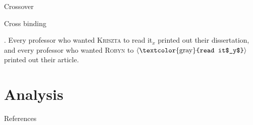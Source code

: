 \documentclass{beamer}
\newcommand{\elide}[1]{\ensuremath{\braket{\text{\textcolor{gray}{#1}}}}}
\begin{document}
\begin{frame}{Crossover}


\end{frame}

\begin{frame}{Cross binding}

\ex. Every professor who wanted \textsc{Kriszta} to read it$_x$ printed out their dissertation, and
every professor who wanted \textsc{Robyn} to \elide{read it$_y$} printed out their article.

\end{frame}


\section{Analysis}



\begin{frame}[allowframebreaks]{References}

  \printbibliography[heading=none]

\end{frame}
\end{document}
